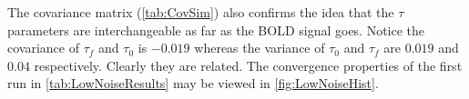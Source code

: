 \begin{figure}
\label{fig:LowNoiseHist}
\end{figure}
The covariance matrix (\autoref{tab:CovSim}) also confirms the idea that the $\tau$ parameters are interchangeable
as far as the BOLD signal goes. Notice the covariance of $\tau_f$ and $\tau_0$ is $-0.019$ whereas
the variance of $\tau_0$ and $\tau_f$ are $0.019$ and $0.04$ respectively. Clearly they are
related. The convergence properties of the first run in \autoref{tab:LowNoiseResults} may be
viewed in \autoref{fig:LowNoiseHist}.


